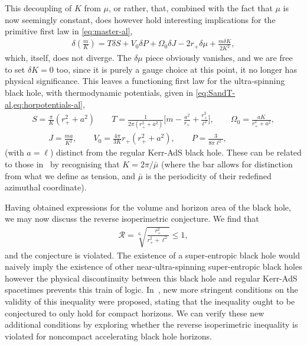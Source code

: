 \documentclass[
twoside,
openright,
frontopenright,
]{dmathesis}
\newcommand{\nn}{\nonumber}
\begin{document}
This decoupling of $K$ from $\mu$, or rather, that, combined with the fact that
$\mu$ is now seemingly constant, does however hold interesting implications for
the primitive first law in \cref{eq:master-al},
\begin{align}\label{eq:master-al2}
\delta\left(\frac{m}{K}\right)=T\delta S +V_0\delta P + \Omega_0\delta J -
  2r_+\delta\mu + \frac{m\delta K}{2K^2},
\end{align}
which, itself, does not diverge. The $\delta \mu$ piece obviously vanishes, and
we are free to set $\delta K=0$ too, since it is purely a gauge choice at this
point, it no longer has physical significance. This leaves a functioning first
law for the ultra-spinning black hole, with thermodynamic potentials, given in
\cref{eq:SandT-al,eq:horpotentials-al},
\begin{gather}
S = \frac{\pi}{K}(r_+^2+a^2) \qquad
  T=\frac{1}{2\pi(r_{+}^{2}+a^{2})}
  \bigg[m-\frac{a^{2}}{r_{+}}+\frac{r_{+}^{3}}{\ell^{2}}\bigg],\qquad 
  \Omega_0 =  \frac{a K}{r_{+}^{2}+a^{2}}, \nn\\
  \qquad J=\frac{ma}{K^2}, \qquad V_0 =
  \frac{4\pi}{3K}r_+(r_+^2+a^2), \qquad P = \frac{3}{8\pi\ell^2}, 
\end{gather}
(with $a=\ell$) distinct from the regular Kerr-AdS black hole. These can be
related to those in~\cite{Hennigar:2014cfa,Hennigar:2015cja} by recognising that
$K=2\pi/\bar{\mu}$ (where the bar allows for distinction from what we define as
tension, and $\bar{\mu}$ is the periodicity of their redefined azimuthal
coordinate).

Having obtained expressions for the volume and horizon area of the black hole,
we may now discuss the reverse isoperimetric conjecture. We find that
\begin{align}
  \mathcal{R} =
\sqrt[6~]{\frac{r_{+}^{2}}{r_{+}^{2}+\ell^{2}}}\leqslant 1,
\end{align}
and the conjecture is violated. The existence of a super-entropic black hole
would naively imply the existence of other near-ultra-spinning super-entropic
black holes however the physical discontinuity between this black hole and
regular Kerr-AdS spacetimes prevents this train of
logic. In~\cite{Hennigar:2014cfa}, new more stringent conditions on the validity
of this inequality were proposed, stating that the inequality ought to be
conjectured to only hold for compact horizons. We can verify these new
additional conditions by exploring whether the reverse isoperimetric inequality
is violated for noncompact accelerating black hole horizons.
\end{document}
